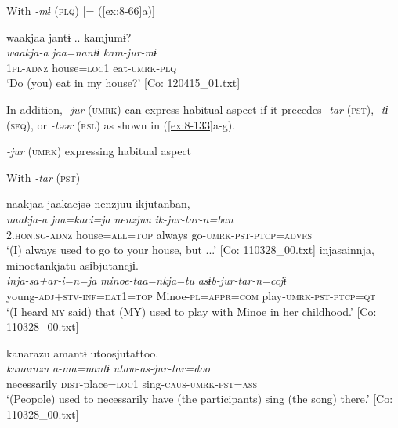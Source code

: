\ex With \textit{-mɨ} (\textsc{plq}) [= (\ref{ex:8-66}a)]

  {\TM}
\glll  waakjaa  jantɨ ..  kamjumɨ?\\
\textit{waakja-a}  \textit{jaa=nantɨ}  \textit{kam-jur-mɨ}\\
    1\textsc{pl}-\textsc{adnz}  house=\textsc{loc}1  eat-\textsc{umrk}-\textsc{plq}\\
\glt ‘Do (you) eat in my house?’ [Co: 120415\_01.txt]
\z
\z

  In addition, \textit{-jur} (\textsc{umrk}) can express habitual aspect if it precedes \textit{-tar} (\textsc{pst}), \textit{-tɨ} (\textsc{seq}), or \textit{-təər} (\textsc{rsl}) as shown in (\ref{ex:8-133}a-g).

\ea\label{ex:8-133}
  \textit{-jur} (\textsc{umrk}) expressing habitual aspect

  With \textit{-tar} (\textsc{pst})

\ea
{\TM}
\glll  naakjaa  jaakacjəə  {\textbar}nenzjuu{\textbar}  ikjutanban,\\
\textit{naakja-a}  \textit{jaa=kaci=ja}  \textit{nenzjuu}  \textit{ik-jur-tar-n=ban}\\
2.\textsc{hon}.\textsc{sg}-\textsc{adnz}  house=\textsc{all}=\textsc{top}  always  go-\textsc{umrk}-\textsc{pst}-\textsc{ptcp}=\textsc{advrs}\\
\glt ‘(I) always used to go to your house, but ...’ [Co: 110328\_00.txt]
\ex
{\TM}
\glll  injasainnja,  minoetankjatu      asɨbjutancjɨ.\\
\textit{inja-sa+ar-i=n=ja}  \textit{minoe-taa=nkja=tu}      \textit{asɨb-jur-tar-n=ccjɨ}\\
young-\textsc{adj}+\textsc{stv}-\textsc{inf}=\textsc{dat1}=\textsc{top}  Minoe-\textsc{pl}=\textsc{appr}=\textsc{com} play-\textsc{umrk}-\textsc{pst}-\textsc{ptcp}=\textsc{qt}\\
\glt ‘(I heard \textsc{my} said) that (MY) used to play with Minoe in her childhood.’ [Co: 110328\_00.txt]

\ex
{\TM}
\glll  {\textbar}kanarazu{\textbar}  amantɨ  utoosjutattoo.\\
\textit{kanarazu}  \textit{a-ma=nantɨ}  \textit{utaw-as-jur-tar=doo}\\
necessarily  \textsc{dist}-place=\textsc{loc}1  sing-\textsc{caus}-\textsc{umrk}-\textsc{pst}=\textsc{ass}\\
\glt ‘(Peopole) used to necessarily have (the participants) sing (the song) there.’ [Co: 110328\_00.txt]

